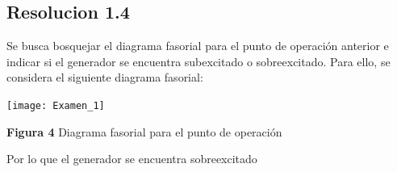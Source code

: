 \documentclass[
  11pt,
  letterpaper,
   addpoints,
   answers
  ]{exam}
\begin{document}
\begin{questions}
\begin{solution}
    \subsection*{Resolucion 1.4}
    Se busca bosquejar el diagrama fasorial para el punto de operación anterior e indicar si el generador se encuentra subexcitado o sobreexcitado. Para ello, se considera el siguiente diagrama fasorial:
    \begin{center}
        \texttt{[image: Examen\_1]}
    \end{center}
    \begin{center}
        \textbf{Figura 4} Diagrama fasorial para el punto de operación
    \end{center}
    Por lo que el generador se encuentra sobreexcitado
    \end{solution}
\end{questions}
\newpage
\end{document}

